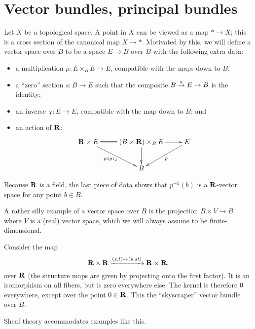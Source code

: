 \section{Vector bundles, principal bundles}
Let $X$ be a topological space. A point in $X$ can be viewed as a map $\ast\to
X$; this is a cross section of the canonical map $X\to \ast$. Motivated by
this, we will define a vector space over $B$ to be a space $E\to B$ over $B$
with the following extra data:
\begin{itemize}
    \item a multiplication $\mu:E\times_B E\to E$, compatible with the maps
	down to $B$;
    \item a ``zero'' section $s:B\to E$ such that the composite $B\xrightarrow{{s}}E\to
	B$ is the identity;
    \item an inverse $\chi:E\to E$, compatible with the map down to $B$; and
    \item an action of $\mathbf R$:
	\begin{equation*}
	    \xymatrix{
		\RR\times E\ar[dr]_{p\circ \pr_2}\ar@{=}[r] &
		(B\times\RR)\times_B E\ar[r]\ar[d] & E\ar[dl]^p\\
		& B &
	    }
	\end{equation*}
\end{itemize}
Because $\mathbf R$ is a field, the last piece of data shows that $p^{-1}(b)$ is a
$\mathbf R$-vector space for any point $b\in B$.
\begin{example}\label{trivialvectorbundle}
    A rather silly example of a vector space over $B$ is the projection
    $B\times V\to B$ where $V$ is a (real) vector space, which we will always
    assume to be finite-dimensional.
\end{example}
\begin{example}
    Consider the map
    $$\mathbf R\times\mathbf R\xrightarrow{(s,t)\mapsto(s,st)}\mathbf R\times\mathbf R,$$
    over $\mathbf R$ (the structure maps are given by projecting onto the first
    factor). It is an isomorphism on all fibers, but is zero everywhere else.
    The kernel is therefore $0$ everywhere, except over the point $0\in\mathbf R$.
    This the ``skyscraper'' vector bundle over $B$.
\end{example}
Sheaf theory accommodates examples like this.

